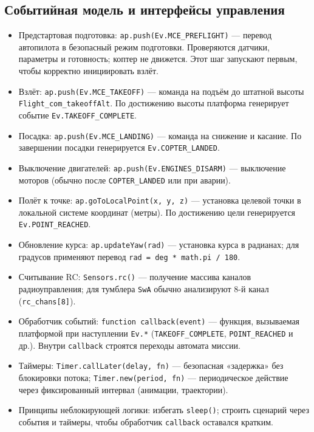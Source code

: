 \subsection{Событийная модель и интерфейсы управления}
\begin{itemize}
  \item Предстартовая подготовка: \texttt{ap.push(Ev.MCE\_PREFLIGHT)} — перевод автопилота в безопасный режим подготовки. Проверяются датчики, параметры и готовность; коптер не движется. Этот шаг запускают первым, чтобы корректно инициировать взлёт.
  \item Взлёт: \texttt{ap.push(Ev.MCE\_TAKEOFF)} — команда на подъём до штатной высоты \texttt{Flight\_com\_takeoffAlt}. По достижению высоты платформа генерирует событие \texttt{Ev.TAKEOFF\_COMPLETE}.
  \item Посадка: \texttt{ap.push(Ev.MCE\_LANDING)} — команда на снижение и касание. По завершении посадки генерируется \texttt{Ev.COPTER\_LANDED}.
  \item Выключение двигателей: \texttt{ap.push(Ev.ENGINES\_DISARM)} — выключение моторов (обычно после \texttt{COPTER\_LANDED} или при аварии).
  \item Полёт к точке: \texttt{ap.goToLocalPoint(x, y, z)} — установка целевой точки в локальной системе координат (метры). По достижению цели генерируется \texttt{Ev.POINT\_REACHED}.
  \item Обновление курса: \texttt{ap.updateYaw(rad)} — установка курса в радианах; для градусов применяют перевод \texttt{rad = deg * math.pi / 180}.
  \item Считывание RC: \texttt{Sensors.rc()} — получение массива каналов радиоуправления; для тумблера \texttt{SwA} обычно анализируют 8-й канал (\texttt{rc\_chans[8]}).
  \item Обработчик событий: \texttt{function callback(event)} — функция, вызываемая платформой при наступлении \texttt{Ev.*} (\texttt{TAKEOFF\_COMPLETE}, \texttt{POINT\_REACHED} и др.). Внутри \texttt{callback} строятся переходы автомата миссии.
  \item Таймеры: \texttt{Timer.callLater(delay, fn)} — безопасная «задержка» без блокировки потока; \texttt{Timer.new(period, fn)} — периодическое действие через фиксированный интервал (анимации, траектории).
  \item Принципы неблокирующей логики: избегать \texttt{sleep()}; строить сценарий через события и таймеры, чтобы обработчик \texttt{callback} оставался кратким.
\end{itemize}
